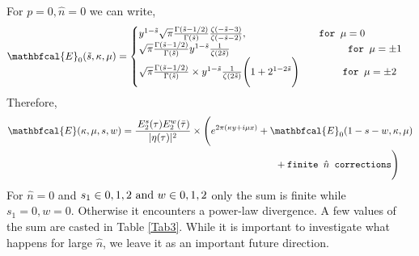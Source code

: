 \documentclass[12 pt]{article}
\begin{document}
\noindent
For $p=0,\hat n=0$ we can write,
\begin{align}
   \mathbfcal{E}_{0}(\tilde s,\kappa,\mu)=
\begin{cases}
y^{1-\tilde s}\sqrt{\pi}\frac{\Gamma(\tilde s-1/2)}{\Gamma(\tilde s)}\frac{\zeta(-\tilde s-3)}{\zeta(-\tilde s-2)} ,\hspace{2.5 cm}\texttt{for $\mu=0$}\\
\sqrt{\pi}\frac{\Gamma(\tilde s-1/2)}{\Gamma(\tilde s)}y^{1-\tilde s}\frac{1}{\zeta(2\tilde s)}\hspace{4.1 cm}\texttt{for $\mu=\pm 1$}\\
\sqrt{\pi}\frac{\Gamma(\tilde s-1/2)}{\Gamma(\tilde s)}\times y^{1-\tilde s}\frac{1}{\zeta(2\tilde s)}\Bigg(1+2^{1-2\tilde s}\Bigg)\hspace{1.5 cm}\texttt{for $\mu=\pm 2$}
\end{cases}
\end{align}
Therefore,
\begin{align}
\begin{split}
    \mathbfcal{E} (\kappa,\mu,s,w)=\frac{\,E_2^s(\tau)E_2^w(\bar \tau)}{|\eta(\tau)|^2}&\times \Bigg(e^{2\pi(\kappa y+i\mu x)}+\mathbfcal{E}_{0}(1-s-w,\kappa,\mu)\\&\hspace{3 cm}
    +\texttt{finite $\hat n$ corrections}\Bigg)
    \end{split}
\end{align}
For $\hat n =0$  and $s_1\in 0,1,2 \text{\,\,and\,\,} w\in 0,1,2$ only the sum is finite while $s_1=0,w=0$. Otherwise it encounters a power-law divergence. A few values of the sum are casted in Table \eqref{Tab3}. While it is important to investigate what happens for large $\hat{n}$, we leave it as an important future direction.

%
%

\end{document}
